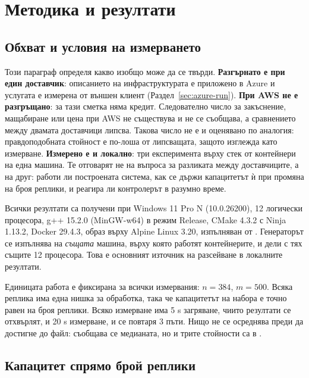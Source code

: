 \section{Методика и резултати}
\label{sec:method}
\label{sec:results}

\subsection{Обхват и условия на измерването}
\label{sec:method-scope}

Този параграф определя какво изобщо може да се твърди. \textbf{Разгърнато е при един доставчик}:
описанието на инфраструктурата е приложено в Azure и услугата е измерена от външен клиент
(Раздел~\ref{sec:azure-run}). \textbf{При AWS не е разгръщано}: за тази сметка няма кредит.
Следователно число за закъснение, мащабиране или цена при AWS не съществува и не се съобщава, а
сравнението между двамата доставчици липсва. Такова число не е и оценявано по аналогия:
правдоподобната стойност е по-лоша от липсващата, защото изглежда като измерване. \textbf{Измерено е и локално}: три експеримента върху стек от контейнери на една машина.
Те отговарят не на въпроса за разликата между доставчиците, а на друг: работи ли построената
система, как се държи капацитетът ѝ при промяна на броя реплики, и реагира ли контролерът в разумно
време.

Всички резултати са получени при Windows 11 Pro N (10.0.26200), 12 логически процесора,
g++ 15.2.0 (MinGW-w64) в режим Release, CMake 4.3.2 с Ninja 1.13.2, Docker 29.4.3, образ върху
Alpine Linux 3.20, изпълняван от . Генераторът се изпълнява на \emph{същата} машина,
върху която работят контейнерите, и дели с тях същите 12 процесора. Това е основният източник на
разсейване в локалните резултати.

Единицата работа е фиксирана за всички измервания: $n = 384$, $m = 500$. Всяка реплика има една
нишка за обработка, така че капацитетът на набора е точно равен на броя реплики. Всяко измерване
има 5 s загряване, чиито резултати се отхвърлят, и 20 s измерване, и се повтаря 3 пъти. Нищо не се
осреднява преди да достигне до файл: съобщава се медианата, но и трите стойности са в
.

\subsection{Капацитет спрямо брой реплики}

